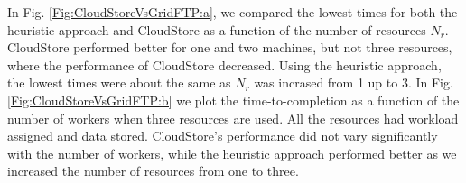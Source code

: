 \documentclass{rspublic}
\begin{document}
In Fig.  \ref{Fig:CloudStoreVsGridFTP:a}, we compared the lowest times
for both the heuristic approach and CloudStore as a function of the
number of resources $N_r$. CloudStore performed better for one and two
machines, but not three resources, where the performance of CloudStore
decreased. Using the heuristic approach, the lowest times were about
the same as $N_r$ was incrased from 1 up to 3. In
Fig. \ref{Fig:CloudStoreVsGridFTP:b} we plot the time-to-completion as
a function of the number of workers when three resources are used. All
the resources had workload assigned and data stored. CloudStore's
performance did not vary significantly with the number of workers,
while the heuristic approach performed better as we increased the
number of resources from one to three.

\begin{figure}
\begin{center}
\end{center}
\end{figure}
\end{document}
